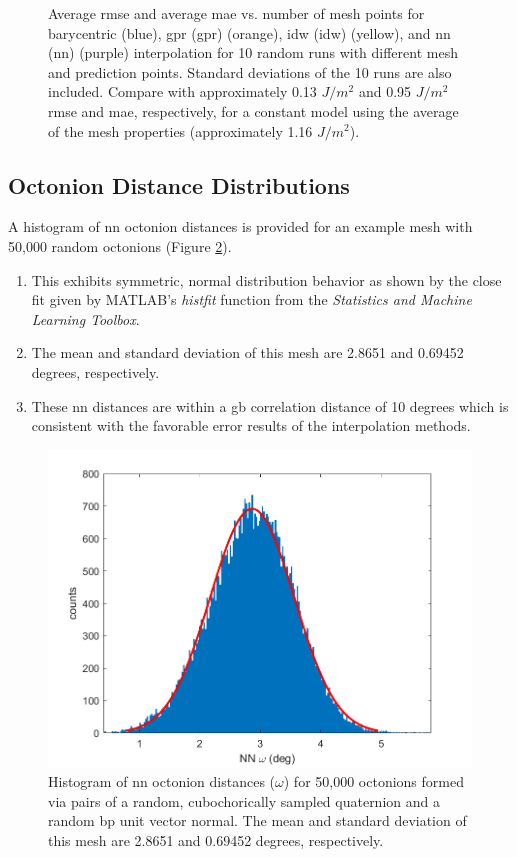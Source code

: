 \documentclass[preprint,12pt]{elsarticle}
\begin{document}
\begin{figure}
    \caption{Average \acrlong{rmse} and average \acrlong{mae} vs. number of mesh points for barycentric (blue), \acrlong{gpr} (\acrshort{gpr}) (orange), \acrlong{idw} (\acrshort{idw}) (yellow), and \acrlong{nn} (\acrshort{nn}) (purple) interpolation for 10 random runs with different mesh and prediction points. Standard deviations of the 10 runs are also included. Compare with approximately 0.13 $J/m^2$ and 0.95 $J/m^2$ \acrshort{rmse} and \acrshort{mae}, respectively, for a constant model using the average of the mesh properties (approximately 1.16 $J/m^2$).}
    \label{fig:brkerror}
\end{figure}
    
\subsection{Octonion Distance Distributions} \label{sec:results:dist}
A histogram of \gls{nn} octonion distances is provided for an example mesh with 50,000 random octonions (Figure \ref{fig:nndist}).
\begin{enumerate}
    \item This exhibits symmetric, normal distribution behavior as shown by the close fit given by MATLAB's \textit{histfit} function from the \textit{Statistics and Machine Learning Toolbox}.
    \item The mean and standard deviation of this mesh are 2.8651 and 0.69452 degrees, respectively.
    \item These \gls{nn} distances are within a \gls{gb} correlation distance of 10 degrees \cite{rohrerComparingCalculatedMeasured2010} which is consistent with the favorable error results of the interpolation methods.
\end{enumerate}

\begin{figure}
\centering
\includegraphics{disthist50000.png}
\caption{Histogram of \acrfull{nn} octonion distances ($\omega$) for 50,000 octonions formed via pairs of a random, cubochorically sampled quaternion and a random \acrfull{bp} unit vector normal. The mean and standard deviation of this mesh are 2.8651 and 0.69452 degrees, respectively.}
\label{fig:nndist}
\end{figure}
\end{document}
